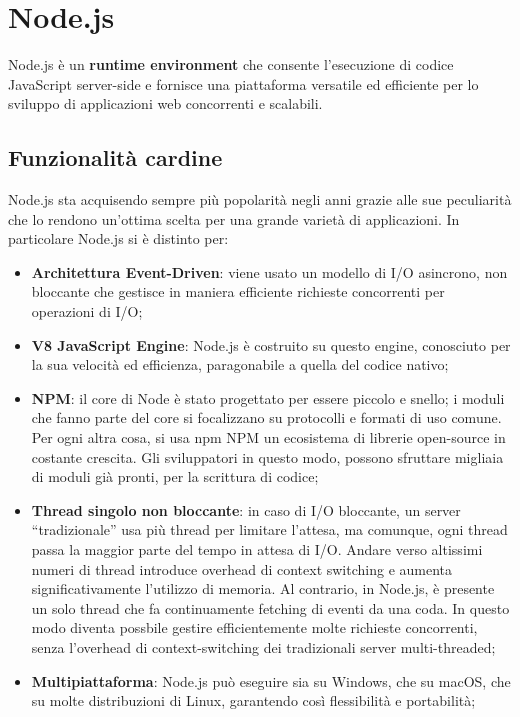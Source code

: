 \newpage


\newpage
\section{Node.js}
\label{sec:Node}
Node.js è un \textbf{runtime environment} che consente l'esecuzione di codice JavaScript server-side e fornisce una piattaforma versatile ed efficiente per lo sviluppo di applicazioni web concorrenti e scalabili.
\subsection{Funzionalità cardine}
Node.js sta acquisendo sempre più popolarità negli anni grazie alle sue peculiarità che lo rendono un'ottima scelta per una grande varietà di applicazioni. In particolare Node.js si è distinto per: 
\begin{itemize}
        \item \textbf{Architettura Event-Driven}: viene usato un modello di I/O asincrono, non bloccante che gestisce in maniera efficiente richieste concorrenti per operazioni di I/O;
        \item \textbf{V8 JavaScript Engine}: Node.js è costruito su questo engine, conosciuto per la sua velocità ed efficienza, paragonabile a quella del codice nativo;
        \item \textbf{NPM}: il core di Node è stato progettato per essere piccolo e snello; i moduli che fanno parte del core si focalizzano su protocolli e formati di uso comune. Per ogni altra cosa, si usa npm NPM un ecosistema di librerie open-source in costante crescita. Gli sviluppatori in questo modo, possono sfruttare migliaia di moduli già pronti, per la scrittura di codice;
        \item \textbf{Thread singolo non bloccante}: in caso di I/O bloccante, un server “tradizionale” usa più thread per limitare l’attesa, ma comunque, ogni thread passa la maggior parte del tempo in attesa di I/O. Andare verso altissimi numeri di thread introduce overhead di context switching e aumenta significativamente l'utilizzo di memoria. Al contrario, in Node.js, è presente un solo thread che fa continuamente fetching di eventi da una coda. In questo modo diventa possbile gestire efficientemente molte richieste concorrenti, senza l'overhead di context-switching dei tradizionali server multi-threaded;
        \item \textbf{Multipiattaforma}: Node.js può eseguire sia su Windows, che su macOS, che su molte distribuzioni di Linux, garantendo così flessibilità e portabilità;
\end{itemize}
